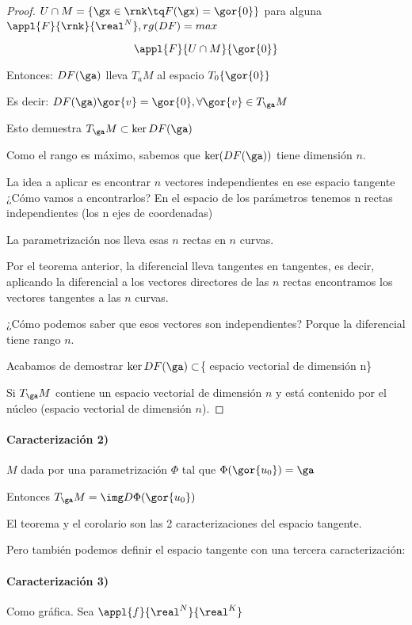 \begin{proof}
$U\cap M =\{ \gx \in \rnk \tq F(\gx) = \gor{0}\}$ para alguna $\appl{F}{\rnk}{\real^N}, rg(DF) = max$

\[\appl{F}{U\cap M}{\gor{0}}\]

Entonces: $DF(\ga)$ lleva $T_a M$ al espacio $T_0\{\gor{0}\}$

Es decir: $DF(\ga)\gor{v} = \gor{0}, \forall \gor{v}\in T_{\ga} M$

Esto demuestra $T_{\ga} M \subset \ker DF(\ga)$

Como el rango es máximo, sabemos que $\ker(DF(\ga))$ tiene dimensión $n$.

La idea a aplicar es encontrar $n$ vectores independientes en ese espacio tangente ¿Cómo vamos a encontrarlos? En el espacio de los parámetros tenemos n rectas independientes (los n ejes de coordenadas)

La parametrización nos lleva esas $n$ rectas en $n$ curvas. 

Por el teorema anterior, la diferencial lleva tangentes en tangentes, es decir, aplicando la diferencial a los vectores directores de las $n$ rectas encontramos los vectores tangentes a las $n$ curvas. 

¿Cómo podemos saber que esos vectores son independientes? Porque la diferencial tiene rango $n$.

Acabamos de demostrar  $\ker DF(\ga) \subset $\{ espacio vectorial de dimensión n\} 

Si $T_{\ga} M$ contiene un espacio vectorial de dimensión $n$ y está contenido por el núcleo (espacio vectorial de dimensión $n$).
\end{proof}

\paragraph{Caracterización 2)}
\begin{corol}
\label{CaractSubv_2}
$M$ dada por una parametrización $\Phi$ tal que $\Phi(\gor{u_0}) = \ga$ 

Entonces $T_{\ga} M = \img D\Phi(\gor{u_0})$

\end{corol}


El teorema y el corolario son las 2 caracterizaciones del espacio tangente.

Pero también podemos definir el espacio tangente con una tercera caracterización:

\paragraph{Caracterización 3)} Como gráfica. Sea $\appl{f}{\real^N}{\real^{K}}$

